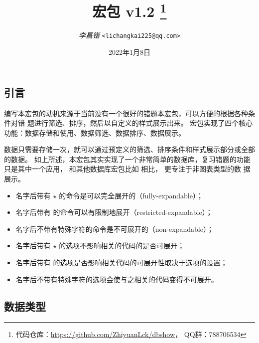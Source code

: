 \documentclass[full]{l3doc}
\def\zhdate{2022年1月8日}
\def\version{v1.2}
\begin{document}
\title{
   宏包 \version%
  \protect\footnote{%
    代码仓库：\url{https://github.com/ZhiyuanLck/dbshow}，
    QQ群：788706534}
}
\author{\textit{李昌锴} \texttt{<lichangkai225@qq.com>}}
\date{\zhdate}
\maketitle

\tableofcontents

\begin{documentation}

\section{引言}
编写本宏包的动机来源于当前没有一个很好的错题本宏包，可以方便的根据各种条件对错
题进行筛选、排序，然后以自定义的样式展示出来。 宏包实现了四个核心
功能：数据存储和使用、数据筛选、数据排序、数据展示。

数据只需要存储一次，就可以通过预定义的筛选、排序条件和样式展示部分或全部的数据。
如上所述，本宏包其实实现了一个非常简单的数据库，复习错题的功能只是其中一个应用，
和其他数据库宏包比如  相比， 更专注于非图表类型的数
据展示。

\begin{itemize}
  \item 名字后带有 $\star$ 的命令是可以完全展开的（fully-expandable）；
  \item 名字后带有  的命令可以有限制地展开（restricted-expandable）；
  \item 名字后不带有特殊字符的命令是不可展开的（non-expandable）；
  \item 名字后带有 $\star$ 的选项不影响相关的代码的是否可展开；
  \item 名字后带有  的选项是否影响相关代码的可展开性取决于选项的设置；
  \item 名字后不带有特殊字符的选项会使与之相关的代码变得不可展开。
\end{itemize}

\subsection{数据类型}


\end{documentation}
\end{document}
